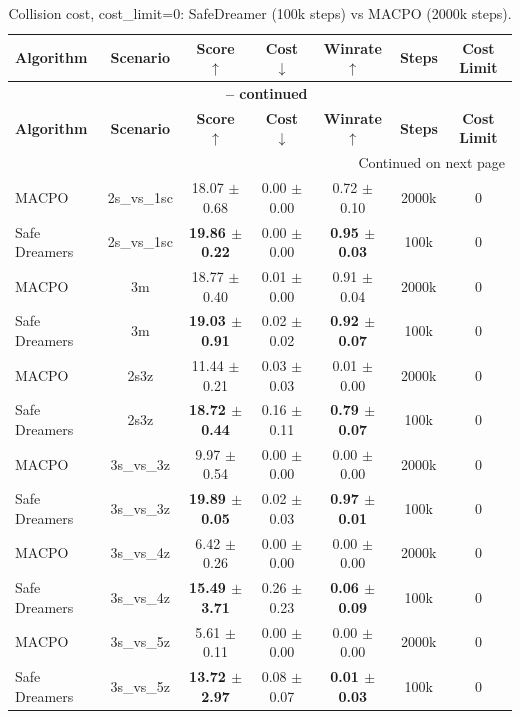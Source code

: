 \documentclass{article}
\begin{document}
\begin{longtable}{lcccccc}
\caption{Collision cost, cost\_limit=0: SafeDreamer (100k steps) vs MACPO (2000k steps).}\\
\toprule
\textbf{Algorithm} & \textbf{Scenario} & \textbf{Score} $\uparrow$ & \textbf{Cost} $\downarrow$ & \textbf{Winrate} $\uparrow$ & \textbf{Steps} & \textbf{Cost Limit} \\
\midrule
\endfirsthead
\multicolumn{7}{c}{{\bfseries \tablename\ \thetable{} -- continued}} \\
\toprule
\textbf{Algorithm} & \textbf{Scenario} & \textbf{Score} $\uparrow$ & \textbf{Cost} $\downarrow$ & \textbf{Winrate} $\uparrow$ & \textbf{Steps} & \textbf{Cost Limit} \\
\midrule
\endhead
\midrule \multicolumn{7}{r}{{Continued on next page}} \\
\endfoot
\bottomrule
\endlastfoot
MACPO & 2s\_vs\_1sc & 18.07 $\pm$ 0.68 & 0.00 $\pm$ 0.00 & 0.72 $\pm$ 0.10 & 2000k & 0 \\
Safe Dreamers & 2s\_vs\_1sc & \textbf{19.86 $\pm$ 0.22} & 0.00 $\pm$ 0.00 & \textbf{0.95 $\pm$ 0.03} & 100k & 0 \\
\midrule
MACPO & 3m & 18.77 $\pm$ 0.40 & 0.01 $\pm$ 0.00 & 0.91 $\pm$ 0.04 & 2000k & 0 \\
Safe Dreamers & 3m & \textbf{19.03 $\pm$ 0.91} & 0.02 $\pm$ 0.02 & \textbf{0.92 $\pm$ 0.07} & 100k & 0 \\
\midrule
MACPO & 2s3z & 11.44 $\pm$ 0.21 & 0.03 $\pm$ 0.03 & 0.01 $\pm$ 0.00 & 2000k & 0 \\
Safe Dreamers & 2s3z & \textbf{18.72 $\pm$ 0.44} & 0.16 $\pm$ 0.11 & \textbf{0.79 $\pm$ 0.07} & 100k & 0 \\
\midrule
MACPO & 3s\_vs\_3z & 9.97 $\pm$ 0.54 & 0.00 $\pm$ 0.00 & 0.00 $\pm$ 0.00 & 2000k & 0 \\
Safe Dreamers & 3s\_vs\_3z & \textbf{19.89 $\pm$ 0.05} & 0.02 $\pm$ 0.03 & \textbf{0.97 $\pm$ 0.01} & 100k & 0 \\
\midrule
MACPO & 3s\_vs\_4z & 6.42 $\pm$ 0.26 & 0.00 $\pm$ 0.00 & 0.00 $\pm$ 0.00 & 2000k & 0 \\
Safe Dreamers & 3s\_vs\_4z & \textbf{15.49 $\pm$ 3.71} & 0.26 $\pm$ 0.23 & \textbf{0.06 $\pm$ 0.09} & 100k & 0 \\
\midrule
MACPO & 3s\_vs\_5z & 5.61 $\pm$ 0.11 & 0.00 $\pm$ 0.00 & 0.00 $\pm$ 0.00 & 2000k & 0 \\
Safe Dreamers & 3s\_vs\_5z & \textbf{13.72 $\pm$ 2.97} & 0.08 $\pm$ 0.07 & \textbf{0.01 $\pm$ 0.03} & 100k & 0 \\

\end{longtable}
\end{document}
